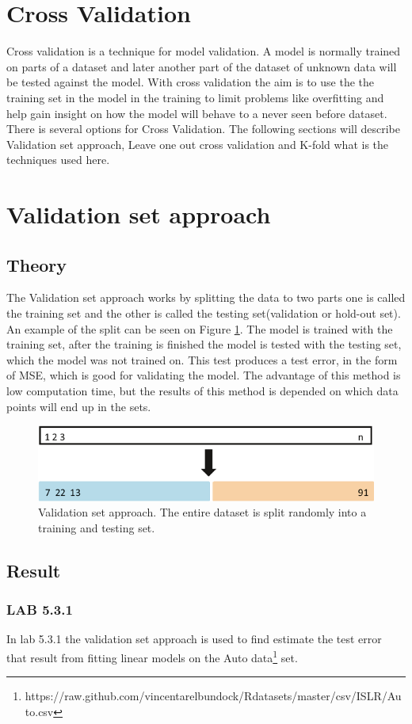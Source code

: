 \section{Cross Validation} \label{sc:crossValidation}
Cross validation is a technique for model validation. A model is normally trained on parts of a dataset and later another part of the dataset of unknown data will be tested against the model. With cross validation the aim is to use the the training set in the model in the training to limit problems like overfitting and help gain insight on how the model will behave to a never seen before dataset. There is several options for Cross Validation. The following sections will describe Validation set approach, Leave one out cross validation and K-fold what is the techniques used here.

\section{Validation set approach}
\subsection{Theory}
The Validation set approach works by splitting the data to two parts one is called the training set and the other is called the testing set(validation or hold-out set). An example of the split can be seen on Figure \ref{fig:validationsetapproach}. The model is trained with the training set, after the training is finished the model is tested with the testing set, which the model was not trained on. This test produces a test error, in the form of MSE, which is good for validating the model. The advantage of this method is low computation time, but the results of this method is depended on which data points will end up in the sets. 
\begin{figure}[H]
	\centering
	\includegraphics[width=0.4\linewidth]{crossValidation/validationSetApproach}
	\caption{Validation set approach. The entire dataset is split randomly into a training and testing set.}
	\label{fig:validationsetapproach}
\end{figure}

\subsection{Result}
\subsubsection*{LAB 5.3.1}%
In lab 5.3.1 the validation set approach is used to find estimate the test error that result from fitting linear models on the Auto data\footnote{https://raw.github.com/vincentarelbundock/Rdatasets/master/csv/ISLR/Auto.csv} set.

